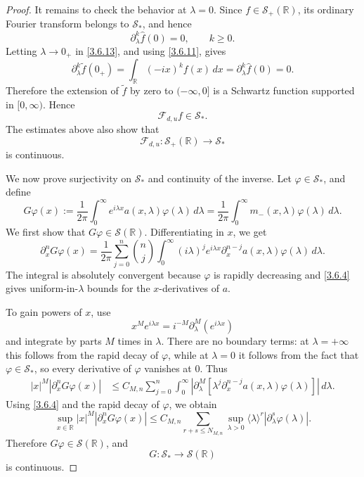 \documentclass[10pt]{article}
\numberwithin{equation}{section}
\numberwithin{theorem}{section}
\begin{document}
\begin{proof}
It remains to check the behavior at \(\lambda=0\). Since \(f\in\mathcal S_+(\mathbb R)\),
its ordinary Fourier transform belongs to \(\mathcal S_*\), and hence
\begin{equation}
\label{3.6.18}
\partial_\lambda^k\widehat f(0)=0,
\qquad k\ge0.
\end{equation}
Letting \(\lambda\to0_{+}\) in \eqref{3.6.13}, and using \eqref{3.6.11}, gives
\begin{equation}
\label{3.6.19}
\partial_\lambda^k\widetilde f(0_{+})
=
\int_{\mathbb R}(-ix)^kf(x)\,dx
=
\partial_\lambda^k\widehat f(0)
=
0 .
\end{equation}
Therefore the extension of \(\widetilde f\) by zero to \((-\infty,0]\) is a Schwartz
function supported in \([0,\infty)\). Hence
\[
\mathcal F_{d,u}f\in\mathcal S_*.
\]
The estimates above also show that
\[
\mathcal F_{d,u}:\mathcal S_+(\mathbb R)\to\mathcal S_*
\]
is continuous.

We now prove surjectivity on \(\mathcal S_*\) and continuity of the inverse. Let
\(\varphi\in\mathcal S_*\), and define
\begin{equation}
\label{3.6.20}
G\varphi(x)
:=
\frac1{2\pi}
\int_0^\infty e^{i\lambda x}a(x,\lambda)\varphi(\lambda)\,d\lambda
=
\frac1{2\pi}
\int_0^\infty m_-(x,\lambda)\varphi(\lambda)\,d\lambda .
\end{equation}
We first show that \(G\varphi\in\mathcal S(\mathbb R)\). Differentiating in \(x\), we get
\begin{equation}
\label{3.6.21}
\partial_x^nG\varphi(x)
=
\frac1{2\pi}
\sum_{j=0}^n
\binom nj
\int_0^\infty
(i\lambda)^j e^{i\lambda x}
\partial_x^{n-j}a(x,\lambda)\varphi(\lambda)\,d\lambda .
\end{equation}
The integral is absolutely convergent because \(\varphi\) is rapidly decreasing and
\eqref{3.6.4} gives uniform-in-\(\lambda\) bounds for the \(x\)-derivatives of \(a\).

To gain powers of \(x\), use
\[
x^M e^{i\lambda x}=i^{-M}\partial_\lambda^M(e^{i\lambda x})
\]
and integrate by parts \(M\) times in \(\lambda\). There are no boundary terms: at
\(\lambda=+\infty\) this follows from the rapid decay of \(\varphi\), while at
\(\lambda=0\) it follows from the fact that \(\varphi\in\mathcal S_*\), so every
derivative of \(\varphi\) vanishes at \(0\). Thus
\[
\begin{aligned}
|x|^M|\partial_x^nG\varphi(x)|
&\le
C_{M,n}
\sum_{j=0}^n
\int_0^\infty
\left|
\partial_\lambda^M
\left[
\lambda^j\partial_x^{n-j}a(x,\lambda)\varphi(\lambda)
\right]
\right|\,d\lambda .
\end{aligned}
\]
Using \eqref{3.6.4} and the rapid decay of \(\varphi\), we obtain
\begin{equation}
\label{3.6.22}
\sup_{x\in\mathbb R}
|x|^M|\partial_x^nG\varphi(x)|
\le
C_{M,n}
\sum_{r+s\le N_{M,n}}
\sup_{\lambda>0}
\langle\lambda\rangle^r
|\partial_\lambda^s\varphi(\lambda)|.
\end{equation}
Therefore \(G\varphi\in\mathcal S(\mathbb R)\), and
\[
G:\mathcal S_*\to\mathcal S(\mathbb R)
\]
is continuous.


\end{proof}
\end{document}
